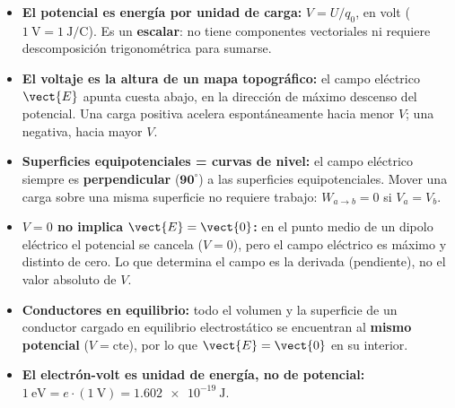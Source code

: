 \documentclass[11pt]{article}
\begin{document}
\begin{eClave}
\begin{itemize}[leftmargin=*,itemsep=2pt,topsep=0pt]
  \item \textbf{El potencial es energía por unidad de carga:} $V=U/q_0$, en volt ($1\ \mathrm{V}=1\ \mathrm{J/C}$). Es un \textbf{escalar}: no tiene componentes vectoriales ni requiere descomposición trigonométrica para sumarse.
  \item \textbf{El voltaje es la altura de un mapa topográfico:} el campo eléctrico $\vect{E}$ apunta cuesta abajo, en la dirección de máximo descenso del potencial. Una carga positiva acelera espontáneamente hacia menor $V$; una negativa, hacia mayor $V$.
  \item \textbf{Superficies equipotenciales = curvas de nivel:} el campo eléctrico siempre es \textbf{perpendicular} ($\mathbf{90^\circ}$) a las superficies equipotenciales. Mover una carga sobre una misma superficie no requiere trabajo: $W_{a\to b}=0$ si $V_a=V_b$.
  \item \textbf{$V=0$ no implica $\vect{E}=\vect{0}$:} en el punto medio de un dipolo eléctrico el potencial se cancela ($V=0$), pero el campo eléctrico es máximo y distinto de cero. Lo que determina el campo es la derivada (pendiente), no el valor absoluto de $V$.
  \item \textbf{Conductores en equilibrio:} todo el volumen y la superficie de un conductor cargado en equilibrio electrostático se encuentran al \textbf{mismo potencial} ($V=\text{cte}$), por lo que $\vect{E}=\vect{0}$ en su interior.
  \item \textbf{El electrón-volt es unidad de energía, no de potencial:} $1\ \mathrm{eV}=e\cdot(1\ \mathrm{V})=\SI{1,602e-19}{\joule}$.
\end{itemize}
\end{eClave}
\end{document}
